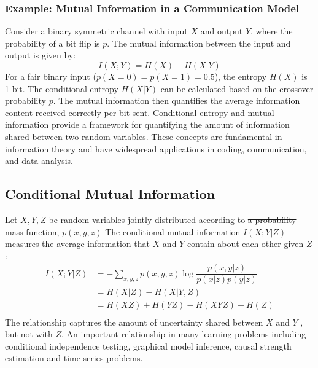 \documentclass[12pt]{article}
\begin{document}
		\subsubsection*{Example: Mutual Information in a Communication Model}
		Consider a binary symmetric channel with input \(X\) and output \(Y\), where the probability of a bit flip is \(p\). The mutual information between the input and output is given by:
		\[ I(X; Y) = H(X) - H(X|Y) \]
		For a fair binary input (\(p(X=0) = p(X=1) = 0.5\)), the entropy \(H(X)\) is 1 bit. The conditional entropy \(H(X|Y)\) can be calculated based on the crossover probability \(p\). The mutual information then quantifies the average information content received correctly per bit sent. Conditional entropy and mutual information provide a framework for quantifying the amount of information shared between two random variables. These concepts are fundamental in information theory and have widespread applications in coding, communication, and data analysis.
		
		\subsection{Conditional Mutual Information}
		Let $X,Y,Z$ be random variables jointly distributed according to \st{a probability mass function,}  $p(x,y,z)$ The conditional mutual information $I(X; Y |Z)$ measures the average information that $X$ and $Y$ contain about each other given $Z$:
		\begin{equation}
			\begin{split}
				I(X; Y |Z) & = - \sum_{x,y,z}  p(x,y,z) \log \dfrac{p(x,y|z)}{p(x|z)p(y|z)} \\
				& = H(X|Z) - H(X|Y,Z) \\
				& = H(X Z) + H(Y Z) - H(X Y Z) - H(Z) \\
			\end{split}
		\end{equation}
		The relationship captures the amount of uncertainty shared between $X$ and $Y$ , but not with $Z$. An important relationship in many learning problems including conditional independence testing, graphical model inference, causal strength estimation and time-series problems. 
		
		
\end{document}
